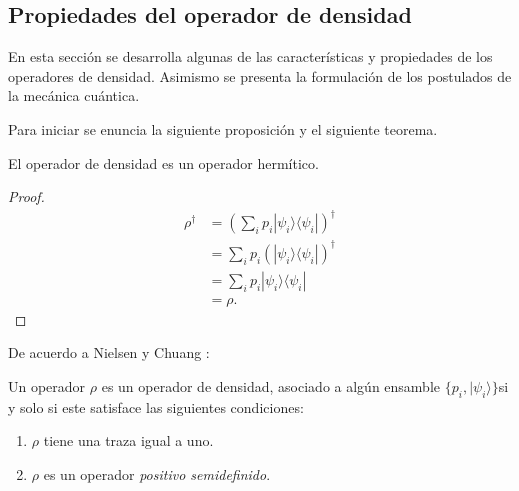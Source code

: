 \begin{comment}
Hasta el momento se puede ver con estas motivaciones que los postulados básicos
de la mecánica cuántica relacionados con la medición y la evolución unitaria
pueden ser reformulados en el lenguaje de los operadores de densidad. En la
siguiente sección se profundiza esta reformulación de los postulados.

\end{comment}
\subsection{Propiedades del operador de densidad}\label{subsec:postulates} %

En esta sección se desarrolla algunas de las características y propiedades de
los operadores de densidad. Asimismo se presenta la formulación de los
postulados de la mecánica cuántica. 

Para iniciar se enuncia la siguiente proposición y el siguiente teorema. 

\begin{proposition}El operador de densidad es un operador hermítico.\end{proposition}


\begin{proof}
	\begin{equation}
		\begin{split}
			\rho^\dagger&={\left(\sum_{i} p_i|\psi_i\rangle \langle \psi_i|\right)}^{\dagger}\\
			&=\sum_{i} p_i {\left(|\psi_i\rangle \langle\psi_i|\right)}^{\dagger}\\
			&=\sum_{i} p_i |\psi_i\rangle \langle\psi_i|\\
			&=\rho.
		\end{split}
	\end{equation}
	
\end{proof}

De acuerdo a Nielsen y Chuang {\cite{nielsen_chuang_2010}}:
\begin{theorem} Un operador
$\rho$ es un operador de densidad, asociado a algún ensamble $\{p_i,
|\psi_i\rangle\}$si y solo si este satisface las siguientes condiciones:
\begin{enumerate}
	\item $\rho$ tiene una traza igual a uno.
	\item $\rho $ es un operador \textit{positivo semidefinido}.
\end{enumerate}	
\end{theorem}

